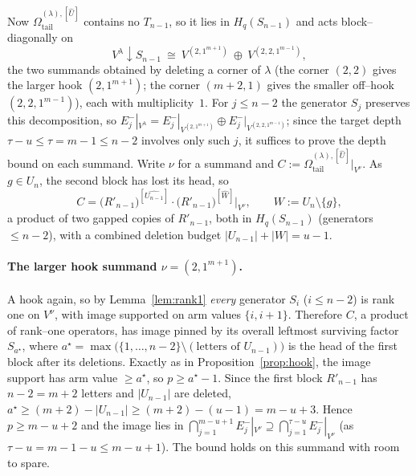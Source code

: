 \documentclass[11pt]{article}
\theoremstyle{definition}
\newcommand{\Vlam}{V^\lambda}
\newcommand{\Vnu}{V^\nu}
\newcommand{\Rp}{{R'}}
\newcommand{\Em}[1]{E^{-}_{#1}}
\newcommand{\OmU}{\Omega^{(\lambda),[\widehat U]}_{\mathrm{tail}}}
\begin{document}
Now $\OmU{}$ contains no $T_{n-1}$, so it lies in $H_q(S_{n-1})$ and acts
block--diagonally on
\[
   \Vlam\!\downarrow\! S_{n-1}\ \cong\ V^{(2,1^{m+1})}\ \oplus\ V^{(2,2,1^{m-1})},
\]
the two summands obtained by deleting a corner of $\lambda$ (the corner $(2,2)$ gives the
larger hook $(2,1^{m+1})$; the corner $(m+2,1)$ gives the smaller off--hook
$(2,2,1^{m-1})$), each with multiplicity~$1$. For $j\le n-2$ the generator $S_j$ preserves
this decomposition, so $\Em j|_{\Vlam}=\Em j|_{V^{(2,1^{m+1})}}\oplus\Em j|_{V^{(2,2,1^{m-1})}}$;
since the target depth $\tau-u\le\tau=m-1\le n-2$ involves only such $j$, it suffices to
prove the depth bound on each summand. Write $\nu$ for a summand and $C:=\OmU{}
|_{\Vnu}$. As $g\in U_n$, the second block has lost its head, so
\[
   C=\big(\Rp_{n-1}\big)^{[\widehat{U_{n-1}}]}\cdot\big(\Rp_{n-1}\big)^{[\widehat{W}]}
   \big|_{\Vnu},\qquad W:=U_n\setminus\{g\},
\]
a product of two gapped copies of $\Rp_{n-1}$, both in $H_q(S_{n-1})$ (generators $\le
n-2$), with a combined deletion budget $|U_{n-1}|+|W|=u-1$.

\paragraph{The larger hook summand $\nu=(2,1^{m+1})$.} A hook again, so by
Lemma~\ref{lem:rank1} \emph{every} generator $S_i$ ($i\le n-2$) is rank one on $\Vnu$, with
image supported on arm values $\{i,i+1\}$. Therefore $C$, a product of rank--one operators,
has image pinned by its overall leftmost surviving factor $S_{a^\star}$, where
$a^\star=\max\big(\{1,\dots,n-2\}\setminus(\text{letters of }U_{n-1})\big)$ is the head of the
first block after its deletions. Exactly as in Proposition~\ref{prop:hook}, the image
support has arm value $\ge a^\star$, so $p\ge a^\star-1$. Since the first block
$\Rp_{n-1}$ has $n-2=m+2$ letters and $|U_{n-1}|$ are deleted, $a^\star\ge(m+2)-|U_{n-1}|\ge
(m+2)-(u-1)=m-u+3$. Hence $p\ge m-u+2$ and the image lies in
$\bigcap_{j=1}^{m-u+1}\Em j|_{\Vnu}\supseteq\bigcap_{j=1}^{\tau-u}\Em j|_{\Vnu}$
(as $\tau-u=m-1-u\le m-u+1$). The bound holds on this summand with room to spare.
\end{document}
